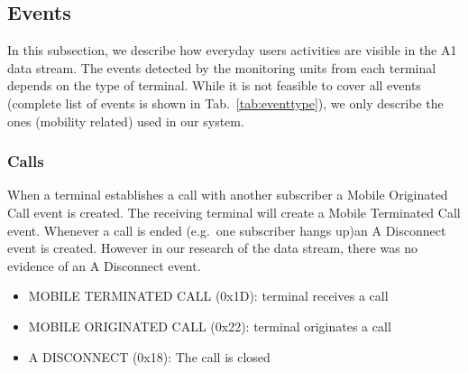 \documentclass[master,english]{hgbthesis}
\begin{document}
\subsection{Events}
\label{subsec:events}
In this subsection, we describe how everyday users activities are visible in the A1 data stream. The events detected by the monitoring units from each terminal depends on the type of terminal. While it is not feasible to cover all events (complete list of events is shown in Tab.~\ref{tab:eventtype}), we only describe the ones (mobility related) used in our system. 
\subsubsection{Calls}
When a terminal establishes a call with another subscriber a Mobile Originated Call event is created. The receiving terminal will create a Mobile Terminated Call event. Whenever a call is ended (e.g.\ one subscriber hangs up)an A Disconnect event is created. However in our research of the data stream, there was no evidence of an A Disconnect event.
\begin{itemize}
	\item MOBILE TERMINATED CALL (0x1D): terminal receives a call
	\item MOBILE ORIGINATED CALL (0x22): terminal originates a call
	\item A DISCONNECT (0x18): The call is closed
\end{itemize}
\end{document}
